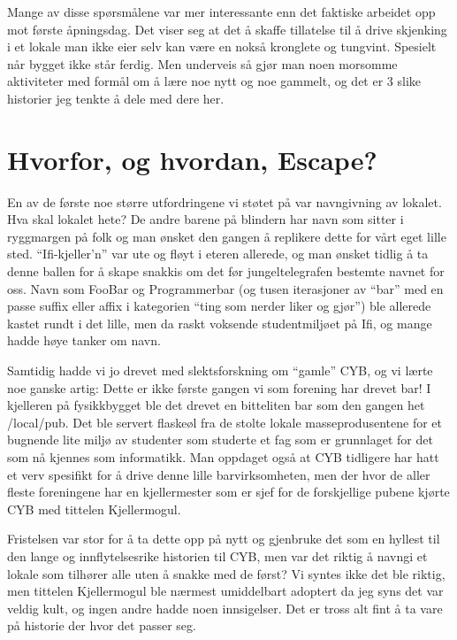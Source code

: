 Mange av disse spørsmålene var mer interessante enn det faktiske arbeidet opp mot første åpningsdag. Det viser seg at det å skaffe tillatelse til å drive skjenking i et lokale man ikke eier selv kan være en nokså kronglete og tungvint. Spesielt når bygget ikke står ferdig. Men underveis så gjør man noen morsomme aktiviteter med formål om å lære noe nytt og noe gammelt, og det er 3 slike historier jeg tenkte å dele med dere her.

\section{Hvorfor, og hvordan, Escape?}

En av de første noe større utfordringene vi støtet på var navngivning av lokalet. Hva skal lokalet hete? De andre barene på blindern har navn som sitter i ryggmargen på folk og man ønsket den gangen å replikere dette for vårt eget lille sted. ``Ifi-kjeller’n'' var ute og fløyt i eteren allerede, og man ønsket tidlig å ta denne ballen for å skape snakkis om det før jungeltelegrafen bestemte navnet for oss. Navn som FooBar og Programmerbar (og tusen iterasjoner av ``bar'' med en passe suffix eller affix i kategorien ``ting som nerder liker og gjør'') ble allerede kastet rundt i det lille, men da raskt voksende studentmiljøet på Ifi, og mange hadde høye tanker om navn.

Samtidig hadde vi jo drevet med slektsforskning om ``gamle'' CYB, og vi lærte noe ganske artig: Dette er ikke første gangen vi som forening har drevet bar! I kjelleren på fysikkbygget ble det drevet en bitteliten bar som den gangen het /local/pub. Det ble servert flaskeøl fra de stolte lokale masseprodusentene for et bugnende lite miljø av studenter som studerte et fag som er grunnlaget for det som nå kjennes som informatikk. Man oppdaget også at CYB tidligere har hatt et verv spesifikt for å drive denne lille barvirksomheten, men der hvor de aller fleste foreningene har en kjellermester som er sjef for de forskjellige pubene kjørte CYB med tittelen Kjellermogul.

Fristelsen var stor for å ta dette opp på nytt og gjenbruke det som en hyllest til den lange og innflytelsesrike historien til CYB, men var det riktig å navngi et lokale som tilhører alle uten å snakke med de først? Vi syntes ikke det ble riktig, men tittelen Kjellermogul ble nærmest umiddelbart adoptert da jeg syns det var veldig kult, og ingen andre hadde noen innsigelser. Det er tross alt fint å ta vare på historie der hvor det passer seg.

